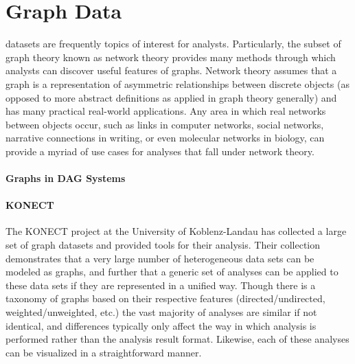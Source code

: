 \section{Graph Data}
\label{sec:graph_data}
 datasets are frequently topics of interest for analysts. Particularly, the subset of graph theory known as network theory provides many methods through which analysts can discover useful features of graphs. Network theory assumes that a graph is a representation of asymmetric relationships between discrete objects (as opposed to more abstract definitions as applied in graph theory generally) and has many practical real-world applications. Any area in which real networks between objects occur, such as links in computer networks, social networks, narrative connections in writing,  or even molecular networks in biology, can provide a myriad of use cases for analyses that fall under network theory. 

\paragraph{Graphs in DAG Systems}

\paragraph{KONECT}
The KONECT project \cite{Kunegis2013} at the University of Koblenz-Landau has collected a large set of graph datasets and provided tools for their analysis. Their collection demonstrates that a very large number of heterogeneous data sets can be modeled as graphs, and further that a generic set of analyses can be applied to these data sets if they are represented in a unified way. Though there is a taxonomy of graphs based on their respective features (directed/undirected, weighted/unweighted, etc.) the vast majority of analyses are similar if not identical, and differences typically only affect the way in which analysis is performed rather than the analysis result format. Likewise, each of these analyses can be visualized in a straightforward manner.

